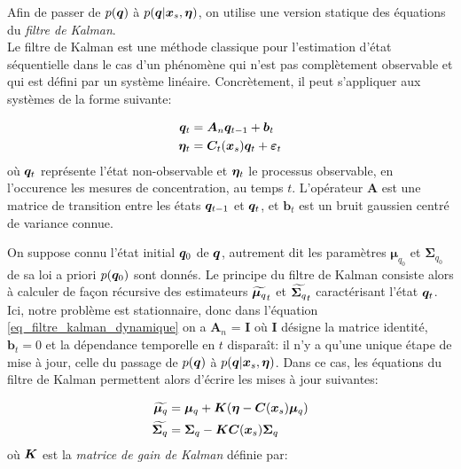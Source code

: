 Afin de passer de $p({\bm{q}})$ à $p({\bm{q}} |{\bm{x}_s}, {\bm{\eta}})$, on utilise une version statique des équations du \textit{filtre de Kalman}.\\

Le filtre de Kalman \cite{Kalman1961} est une méthode classique pour l'estimation d'état séquentielle dans le cas d'un phénomène qui n'est pas complètement observable et qui est défini par un système linéaire. Concrètement, il peut s'appliquer aux systèmes de la forme suivante:

\begin{equation}
\begin{split}
{\bm{q}}_t & = \bm{A}_n{\bm{q}}_{t-1} + \bm{b}_t\\
{\bm{\eta}}_t & = {\bm{C}}_t({\bm{x}_s}) {\bm{q}}_t + {\bm{\varepsilon}}_t
\end{split}
\label{eq_filtre_kalman_dynamique}
\end{equation}
où ${\bm{q}}_t$ représente l'état non-observable et ${\bm{\eta}}_t$ le processus observable, en l'occurence les mesures de concentration, au temps $t$. L'opérateur $\bm{A}$ est une matrice de transition entre les états ${\bm{q}}_{t-1}$ et ${\bm{q}}_t$, et $\bm{b}_t$ est un bruit gaussien centré de variance connue.

 On suppose connu l'état initial ${\bm{q}}_0$ de ${\bm{q}}$,  autrement dit les paramètres $\bm{\mu}_{q_{0}}$ et $\bm{\Sigma}_{q_0}$ de sa loi a priori $p({\bm{q}}_0)$ sont donnés. Le principe du filtre de Kalman consiste alors à calculer de façon récursive des estimateurs ${\widetilde{{\bm{\mu}_q}}}_t$ et ${\widetilde{{\bm{\Sigma}_q}}}_t$ caractérisant l'état ${\bm{q}}_t$.\\
 
 Ici, notre problème est stationnaire, donc dans l'équation \eqref{eq_filtre_kalman_dynamique} on a $\bm{A}_n$ = $\bm{I}$ où $\bm{I}$ désigne la matrice identité, $\bm{b}_t = 0$ et la dépendance temporelle en $t$ disparaît: il n'y a qu'une unique étape de mise à jour, celle du passage de $p({\bm{q}})$ à $p({\bm{q}}|{\bm{x}_s}, {\bm{\eta}})$. Dans ce cas, les équations du filtre de Kalman permettent alors d'écrire les mises à jour suivantes:
 
 \begin{equation}
 \begin{split}
 {\widetilde{{\bm{\mu}_q}}} & = {\bm{\mu}_q} + {\bm{K}}({\bm{\eta}} - {\bm{C}}({\bm{x}_s}){\bm{\mu}_q}) \\
 {\widetilde{{\bm{\Sigma}_q}}} & = {\bm{\Sigma}_q} - {\bm{K}}{\bm{C}}({\bm{x}_s}){\bm{\Sigma}_q}
 \end{split}
 \label{eq_filtre_kalman_statique}
 \end{equation}
 où ${\bm{K}}$ est la \textit{matrice de gain de Kalman} définie par:
 
